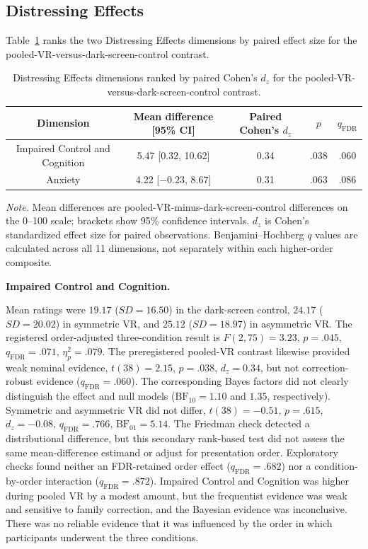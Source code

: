 \documentclass[pdflatex,sn-basic,lineno]{../sn-jnl}
\begin{document}
\subsection{Distressing Effects}
\label{subsec:supp_asc_distressing}

Table~\ref{tab:supp_asc_distressing_drivers} ranks the two Distressing Effects dimensions by paired effect size for the pooled-VR-versus-dark-screen-control contrast.

\begin{table}[!htbp]
\centering
\small
\setlength{\tabcolsep}{3pt}
\caption{Distressing Effects dimensions ranked by paired Cohen's $d_z$ for the pooled-VR-versus-dark-screen-control contrast.}
\label{tab:supp_asc_distressing_drivers}
\begin{tabular*}{\textwidth}{@{\extracolsep{\fill}}ccccc@{}}
\toprule
Dimension & Mean difference [95\% CI] & Paired Cohen's $d_z$ & $p$ & $q_{\mathrm{FDR}}$ \\
\midrule
Impaired Control and Cognition & 5.47 [0.32, 10.62] & 0.34 & .038 & .060 \\
Anxiety & 4.22 [$-0.23$, 8.67] & 0.31 & .063 & .086 \\
\bottomrule
\end{tabular*}
\par\smallskip
\parbox{\textwidth}{\footnotesize\textit{Note.} Mean differences are pooled-VR-minus-dark-screen-control differences on the 0--100 scale; brackets show 95\% confidence intervals. $d_z$ is Cohen's standardized effect size for paired observations. Benjamini--Hochberg $q$ values are calculated across all 11 dimensions, not separately within each higher-order composite.}
\end{table}
\FloatBarrier

\medskip\noindent\textbf{Impaired Control and Cognition.}\nopagebreak[4]

Mean ratings were $19.17$ ($SD=16.50$) in the dark-screen control, $24.17$ ($SD=20.02$) in symmetric VR, and $25.12$ ($SD=18.97$) in asymmetric VR. The registered order-adjusted three-condition result is $F(2,75)=3.23$, $p=.045$, $q_{\mathrm{FDR}}=.071$, $\eta_p^2=.079$. The preregistered pooled-VR contrast likewise provided weak nominal evidence, $t(38)=2.15$, $p=.038$, $d_z=0.34$, but not correction-robust evidence ($q_{\mathrm{FDR}}=.060$). The corresponding Bayes factors did not clearly distinguish the effect and null models ($\mathrm{BF}_{10}=1.10$ and $1.35$, respectively). Symmetric and asymmetric VR did not differ, $t(38)=-0.51$, $p=.615$, $d_z=-0.08$, $q_{\mathrm{FDR}}=.766$, $\mathrm{BF}_{01}=5.14$. The Friedman check detected a distributional difference, but this secondary rank-based test did not assess the same mean-difference estimand or adjust for presentation order. Exploratory checks found neither an FDR-retained order effect ($q_{\mathrm{FDR}}=.682$) nor a condition-by-order interaction ($q_{\mathrm{FDR}}=.872$). Impaired Control and Cognition was higher during pooled VR by a modest amount, but the frequentist evidence was weak and sensitive to family correction, and the Bayesian evidence was inconclusive. There was no reliable evidence that it was influenced by the order in which participants underwent the three conditions.
\end{document}
